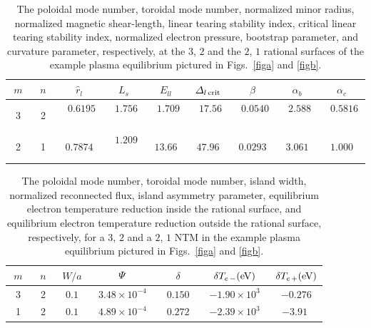 \documentclass{iopjournal}
\begin{document}
{\newpage
\begin{table}
\begin{tabular}{ccccccccc}
\hline
$m$ & $n$ & $\hat{r}_l$ & $L_s$ & $E_{ll}$ & ${\mit\Delta}_{l\,{\rm crit}}$ & $\hat{\beta}$ & $\alpha_b$ & $\alpha_c$\\[0.5ex]\hline
~3~&~2~ & ~$0.6195$~ & ~$1.756$~ & ~$1.709$~ & ~$17.56$~ & ~$0.0540$~ & ~$2.588$~ & ~$0.5816$~\\[0.5ex]
2& 1& $0.7874$  & ~$1.209$~&$ 13.66$ & $47.96$ & $0.0293$ & $3.061$ & $1.000$\\\hline
\end{tabular}
\caption{The poloidal mode number, toroidal mode number, normalized minor radius, normalized magnetic shear-length, linear tearing stability index, critical linear tearing stability index, normalized
electron pressure, bootstrap parameter, and curvature parameter, respectively, at the $3$, $2$ and the $2$, $1$ rational surfaces of the example
plasma equilibrium pictured in Figs.~\ref{figa} and \ref{figb}. \label{t1} }
\end{table}

\begin{table}
\begin{tabular}{ccccccc}
\hline
$m$ & $n$ & $W/a$ & ${\mit\Psi}$ & $\delta$ & ~$\delta T_{e\,-}({\rm eV})$~ & $\delta T_{e\,+}({\rm eV})$ \\[0.5ex]\hline
3& 2& $0.1$  & ~$3.48\times 10^{-4}$~&$0.150$ &  $-1.90\times 10^{3}$ & $-0.276$ \\[0.5ex]
~1~&~2~ & ~$0.1$~ & ~$4.89\times 10^{-4}$~ & ~$0.272$~ &~$-2.39\times 10^{3}$~& ~$-3.91$ ~\\\hline
\end{tabular}
\caption{The poloidal mode number, toroidal mode number, island width, normalized reconnected flux, island asymmetry parameter, equilibrium electron temperature reduction
inside the rational surface,  and equilibrium electron temperature reduction
outside the rational surface, respectively, for a $3$, $2$ and a $2$, $1$ NTM in the example
plasma equilibrium pictured in Figs.~\ref{figa} and \ref{figb}.  \label{t2} }
\end{table}

}
\end{document}

